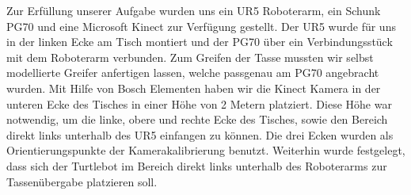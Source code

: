 Zur Erfüllung unserer Aufgabe wurden uns ein UR5 Roboterarm, ein Schunk PG70 und eine Microsoft Kinect zur Verfügung gestellt. Der UR5 wurde für uns in der linken Ecke am Tisch montiert und der PG70 über ein Verbindungsstück mit dem Roboterarm verbunden. Zum Greifen der Tasse mussten wir selbst modellierte Greifer anfertigen lassen, welche passgenau am PG70 angebracht wurden. Mit Hilfe von Bosch Elementen haben wir die Kinect Kamera in der unteren Ecke des Tisches in einer Höhe von 2 Metern platziert. Diese Höhe war notwendig, um die linke, obere und rechte Ecke des Tisches, sowie den Bereich direkt links unterhalb des UR5 einfangen zu können. Die drei Ecken wurden als Orientierungspunkte der Kamerakalibrierung benutzt. Weiterhin wurde festgelegt, dass sich der Turtlebot im Bereich direkt links unterhalb des Roboterarms zur Tassenübergabe platzieren soll.
